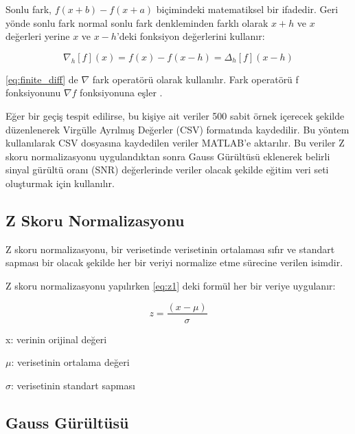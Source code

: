 Sonlu fark, $f(x+b) - f(x+a)$ biçimindeki matematiksel bir ifadedir. Geri yönde sonlu fark normal sonlu fark denkleminden farklı olarak $x + h$ ve $x$ değerleri yerine $x$ ve $x - h$'deki fonksiyon değerlerini kullanır:

\begin{equation}
    \nabla_h[f](x) = f(x) - f(x-h) = \Delta_h[f](x-h)
    \label{eq:finite_diff}
\end{equation}

\eqref{eq:finite_diff} de $\nabla$ fark operatörü olarak kullanılır. Fark operatörü f fonksiyonunu $\nabla f$ fonksiyonuna eşler \cite{FiniteDiff}.

Eğer bir geçiş tespit edilirse, bu kişiye ait veriler 500 sabit örnek içerecek şekilde düzenlenerek Virgülle Ayrılmış Değerler (CSV) formatında kaydedilir. Bu yöntem kullanılarak CSV dosyasına kaydedilen veriler MATLAB'e aktarılır. Bu veriler Z skoru normalizasyonu uygulandıktan sonra Gauss Gürültüsü eklenerek belirli sinyal gürültü oranı (SNR) değerlerinde veriler olacak şekilde eğitim veri seti oluşturmak için kullanılır.


\subsection{Z Skoru Normalizasyonu}
Z skoru normalizasyonu, bir verisetinde verisetinin ortalaması sıfır ve standart sapması bir olacak şekilde her bir veriyi normalize etme sürecine verilen isimdir.

Z skoru normalizasyonu yapılırken \eqref{eq:z1} deki formül her bir veriye uygulanır:

\begin{equation}
    z = \frac{(x - \mu)}{\sigma}
    \label{eq:z1}
\end{equation}

x: verinin orijinal değeri

$\mu$: verisetinin ortalama değeri

$\sigma$: verisetinin standart sapması

\begin{comment}
     E. Kreyszig (1979). Advanced Engineering Mathematics (Fourth ed.). Wiley. p. 880, eq. 5. ISBN 0-471-02140-7.
\end{comment}

\subsection{Gauss Gürültüsü}

